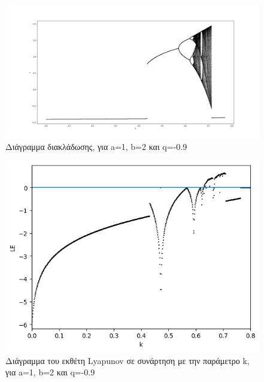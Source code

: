 \begin{figure}[h!]
	\centering
	\includegraphics[width=0.8\linewidth]{LateX images/graphs q09/g1}
	\caption{ Διάγραμμα διακλάδωσης, για a=1, b=2 και q=-0.9}
	\label{f:g14}
\end{figure}

\begin{figure}[h!]
	\centering
	\includegraphics[width=0.6\linewidth]{LateX images/graphs q09/g2}
	\caption{Διάγραμμα του εκθέτη Lyapunov σε συνάρτηση με την παράμετρο k, για a=1, b=2 και q=-0.9}
	\label{f:g15}
\end{figure}

